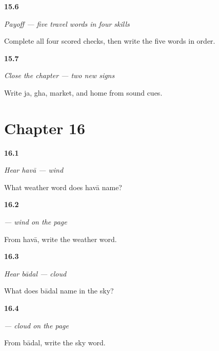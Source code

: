 \noindent\begin{minipage}[t]{\linewidth}
\raggedright
\hypertarget{review-MW-C10-travel-five-payoff}{\textbf{15.6}} \emph{Payoff — five travel words in four skills}\par
\small Complete all four scored checks, then write the five words in order.
\end{minipage}\par\medskip

\noindent\begin{minipage}[t]{\linewidth}
\raggedright
\hypertarget{review-MW-R10-script-close-recall}{\textbf{15.7}} \emph{Close the chapter — two new signs}\par
\small Write ja, gha, market, and home from sound cues.
\end{minipage}\par\medskip

\section*{Chapter 16}

\noindent\begin{minipage}[t]{\linewidth}
\raggedright
\hypertarget{review-MW-C11-hear-hawa-meaning}{\textbf{16.1}} \emph{Hear \emph{havā} — wind}\par
\small What weather word does havā name?
\end{minipage}\par\medskip

\noindent\begin{minipage}[t]{\linewidth}
\raggedright
\hypertarget{review-MW-C11-hawa-dictation}{\textbf{16.2}} \emph{ — wind on the page}\par
\small From havā, write the weather word.
\end{minipage}\par\medskip

\noindent\begin{minipage}[t]{\linewidth}
\raggedright
\hypertarget{review-MW-C11-hear-baadal-meaning}{\textbf{16.3}} \emph{Hear \emph{bādal} — cloud}\par
\small What does bādal name in the sky?
\end{minipage}\par\medskip

\noindent\begin{minipage}[t]{\linewidth}
\raggedright
\hypertarget{review-MW-C11-baadal-dictation}{\textbf{16.4}} \emph{ — cloud on the page}\par
\small From bādal, write the sky word.
\end{minipage}\par\medskip


